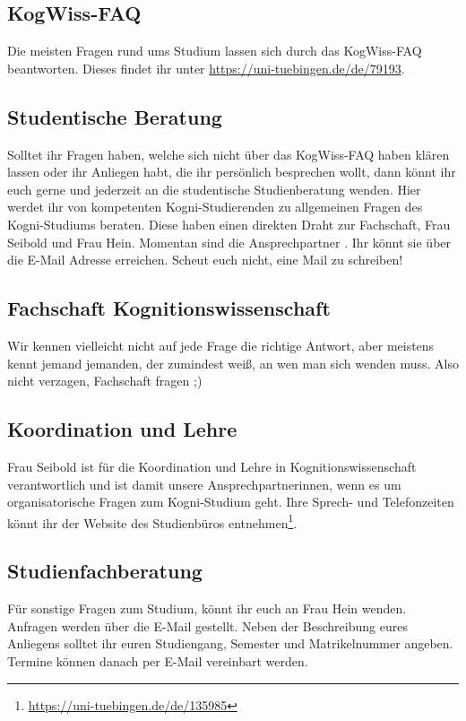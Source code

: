 \subsection*{KogWiss-FAQ}
Die meisten Fragen rund ums Studium lassen sich durch das KogWiss-FAQ beantworten. Dieses findet ihr unter \url{https://uni-tuebingen.de/de/79193}.	%

\subsection*{Studentische Beratung}
Solltet ihr Fragen haben, welche sich nicht über das KogWiss-FAQ haben klären lassen oder ihr Anliegen habt, die ihr persönlich besprechen wollt, dann könnt ihr euch gerne und jederzeit an die studentische Studienberatung wenden. Hier werdet ihr von kompetenten Kogni-Studierenden zu allgemeinen Fragen des Kogni-Studiums beraten. Diese haben einen direkten Draht zur Fachschaft, Frau Seibold und Frau Hein.  Momentan sind die Ansprechpartner \studBeratung. Ihr könnt sie über die E-Mail Adresse  erreichen. Scheut euch nicht, eine Mail zu schreiben!

\subsection*{Fachschaft Kognitionswissenschaft}
Wir kennen vielleicht nicht auf jede Frage die richtige Antwort, aber meistens kennt jemand jemanden, der zumindest weiß, an wen man sich wenden muss. Also nicht verzagen, Fachschaft fragen ;)

\subsection*{Koordination und Lehre}
Frau Seibold ist für die Koordination und Lehre in Kognitionswissenschaft verantwortlich und ist damit unsere Ansprechpartnerinnen, wenn es um organisatorische Fragen zum Kogni-Studium geht. Ihre Sprech- und Telefonzeiten könnt ihr der Website des Studienbüros entnehmen\footnote{\url{https://uni-tuebingen.de/de/135985}}.

\subsection*{Studienfachberatung}
Für sonstige Fragen zum Studium, könnt ihr euch an Frau Hein wenden. Anfragen werden über die E-Mail  gestellt. Neben der Beschreibung eures Anliegens solltet ihr euren Studiengang, Semester und Matrikelnummer angeben. Termine können danach per E-Mail vereinbart werden.

